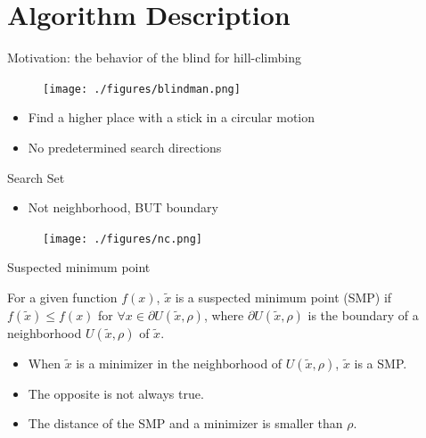 \documentclass{beamer}
\begin{document}
\section{Algorithm Description}

\begin{frame}{Motivation: the behavior of the blind for hill-climbing }
\begin{figure}[!htbp]
	\centering
	  \texttt{[image: ./figures/blindman.png]}
\end{figure}
\begin{itemize}
	\item Find a higher place with a stick in a circular motion
	\item No predetermined search directions
\end{itemize}
\end{frame}

\begin{frame}{Search Set}


\begin{itemize}
	\item Not neighborhood, BUT boundary
%        
\end{itemize}
\begin{figure}[!htbp]
	\centering
	  \texttt{[image: ./figures/nc.png]}
\end{figure}
\end{frame}

\begin{frame}{Suspected minimum point}
	
\begin{definition}
	For a given function $f(x)$,
	$\tilde{x}$ is a suspected minimum point (SMP) if $f(\tilde
	x)\leq f(x)$ for $\forall x\in \partial U(\tilde{x},\rho)$,
	where $\partial U(\tilde{x},\rho)$ is the boundary of
	a neighborhood $U(\tilde{x}, \rho)$ of $\tilde{x}$.
\end{definition}

\begin{itemize}
	\item When $\tilde{x}$ is a minimizer in the neighborhood of
		$U(\tilde{x}, \rho)$, $\tilde{x}$ is a SMP.
	\item The opposite is not always true.
	\item The distance of the SMP and a minimizer is smaller than $\rho$.
\end{itemize}
\end{frame}
\end{document}
